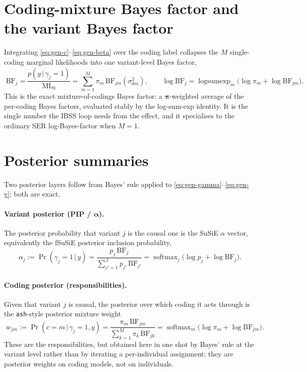 \documentclass[11pt]{article}
\newcommand{\given}{\,\vert\,}
\newcommand{\sigz}[1]{\sigma_{0#1}^{2}}
\newcommand{\BF}{\mathrm{BF}}
\newcommand{\ML}{\mathrm{ML}}
\DeclareMathOperator*{\logsumexp}{logsumexp}
\DeclareMathOperator*{\softmax}{softmax}
\theoremstyle{plain}
\theoremstyle{remark}
\begin{document}
\section{Coding-mixture Bayes factor and the variant Bayes factor}\label{sec:mixbf}

Integrating \eqref{eq:gen-c}--\eqref{eq:gen-beta} over the coding label collapses
the $M$ single-coding marginal likelihoods into one variant-level Bayes factor,
\begin{equation}\label{eq:bf-variant}
\boxed{\;
  \BF_j
  =\frac{p(y\given\gamma_j=1)}{\ML_0}
  =\sum_{m=1}^{M}\pi_m\,\BF_{jm}(\sigz{m}),
  \qquad
  \log\BF_j=\logsumexp_{m}\!\big(\log\pi_m+\log\BF_{jm}\big).
\;}
\end{equation}
This is the exact mixture-of-codings Bayes factor: a $\bm\pi$-weighted average of
the per-coding Bayes factors, evaluated stably by the log-sum-exp identity. It is
the single number the IBSS loop needs from the effect, and it specialises to the
ordinary SER log-Bayes-factor when $M=1$.

\section{Posterior summaries}\label{sec:posterior}

Two posterior layers follow from Bayes' rule applied to
\eqref{eq:gen-gamma}--\eqref{eq:gen-y}; both are exact.

\paragraph{Variant posterior (PIP / $\bm\alpha$).} The posterior probability that
variant $j$ is the causal one is the SuSiE $\alpha$ vector, equivalently the
fSuSiE posterior inclusion probability,
\begin{equation}\label{eq:pip}
\boxed{\;
  \alpha_j:=\Pr(\gamma_j=1\given y)
  =\frac{p_j\,\BF_j}{\sum_{j'=1}^{J}p_{j'}\,\BF_{j'}}
  =\softmax_j\!\big(\log p_j+\log\BF_j\big).
\;}
\end{equation}

\paragraph{Coding posterior (responsibilities).} Given that variant $j$ is
causal, the posterior over which coding it acts through is the \texttt{ash}-style
posterior mixture weight
\begin{equation}\label{eq:w}
\boxed{\;
  w_{jm}:=\Pr(c=m\given\gamma_j=1,y)
  =\frac{\pi_m\,\BF_{jm}}{\sum_{k=1}^{M}\pi_k\,\BF_{jk}}
  =\softmax_m\!\big(\log\pi_m+\log\BF_{jm}\big).
\;}
\end{equation}
These are the responsibilities, but obtained here in one shot by Bayes' rule at
the variant level rather than by iterating a per-individual assignment; they are
posterior weights on coding models, not on individuals.
\end{document}
